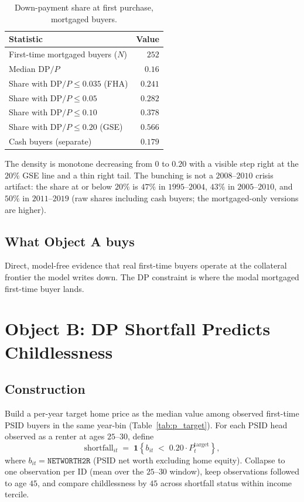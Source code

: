 \documentclass[11pt]{article}
\begin{document}
\begin{table}[H]
\centering
\caption{Down-payment share at first purchase, mortgaged buyers.}
\begin{tabular}{lr}
\toprule
Statistic & Value \\
\midrule
First-time mortgaged buyers ($N$) & $252$ \\
Median $\mathrm{DP}/P$ & $0.16$ \\
Share with $\mathrm{DP}/P \leq 0.035$ (FHA) & $0.241$ \\
Share with $\mathrm{DP}/P \leq 0.05$            & $0.282$ \\
Share with $\mathrm{DP}/P \leq 0.10$            & $0.378$ \\
Share with $\mathrm{DP}/P \leq 0.20$ (GSE)      & $\mathbf{0.566}$ \\
Cash buyers (separate)                          & $0.179$ \\
\bottomrule
\end{tabular}
\end{table}

\noindent The density is monotone decreasing from $0$ to $0.20$ with a visible step right at the $20\%$ GSE line and a thin right tail. The bunching is not a $2008$--$2010$ crisis artifact: the share at or below $20\%$ is $47\%$ in $1995$--$2004$, $43\%$ in $2005$--$2010$, and $50\%$ in $2011$--$2019$ (raw shares including cash buyers; the mortgaged-only versions are higher).

\subsection*{What Object A buys}

Direct, model-free evidence that real first-time buyers operate at the collateral frontier the model writes down. The DP constraint is where the modal mortgaged first-time buyer lands.

\section{Object B: DP Shortfall Predicts Childlessness}

\subsection*{Construction}

Build a per-year target home price as the median value among observed first-time PSID buyers in the same year-bin (Table~\ref{tab:p_target}). For each PSID head observed as a renter at ages $25$--$30$, define
\[
\text{shortfall}_{it} \;=\; \mathbf{1}\!\left\{ b_{it} \;<\; 0.20 \cdot P^{\mathrm{target}}_{t} \right\},
\]
where $b_{it} = \texttt{NETWORTH2R}$ (PSID net worth excluding home equity). Collapse to one observation per ID (mean over the $25$--$30$ window), keep observations followed to age $45$, and compare childlessness by $45$ across shortfall status within income tercile.
\end{document}
